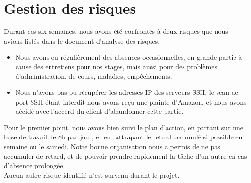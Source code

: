 \section{Gestion des risques}

Durant ces six semaines, nous avons été confrontés à deux risques que nous avions listés dans le document d'analyse des risques.
\begin{itemize}
\item Nous avons eu régulièrement des absences occasionnelles, en grande partie à cause des entretiens pour nos stages, mais aussi pour des problèmes d'administration, de cours, maladies, empêchements.
\item Nous n'avons pas pu récupérer les adresses IP des serveurs SSH, le scan de port SSH étant interdit nous avons reçu une plainte d'Amazon, et nous avons décidé avec l'accord du client d'abandonner cette partie.\\
\end{itemize}

Pour le premier point, nous avons bien suivi le plan d'action, en partant sur une base de travail de 8h par jour, et en rattrapant le retard accumulé si possible en semaine ou le samedi. Notre bonne organisation nous a permis de ne pas accumuler de retard, et de pouvoir prendre rapidement la tâche d'un autre en cas d'absence prolongée.\\
Aucun autre risque identifié n'est survenu durant le projet.
